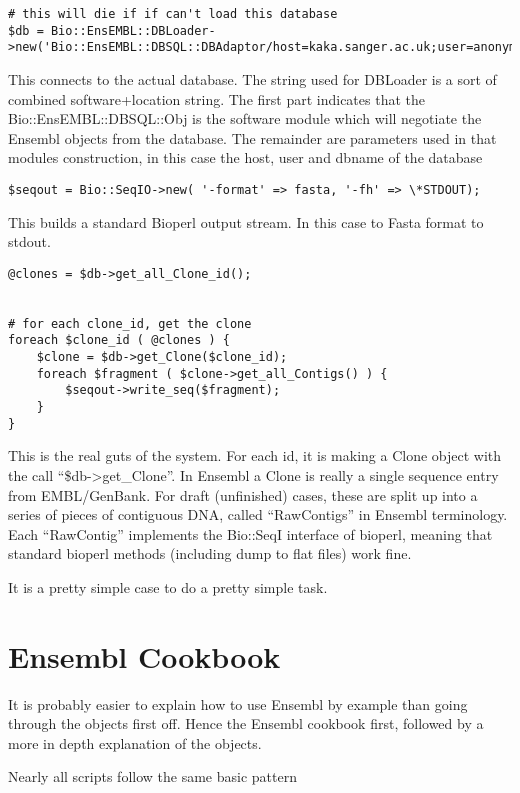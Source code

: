 \documentclass[11pt,a4paper]{article}
\begin{document}
\begin{verbatim}
# this will die if if can't load this database
$db = Bio::EnsEMBL::DBLoader->new('Bio::EnsEMBL::DBSQL::DBAdaptor/host=kaka.sanger.ac.uk;user=anonymous;dbname=current');
\end{verbatim}

This connects to the actual database. The string used for DBLoader is
a sort of combined software+location string. The first part indicates
that the Bio::EnsEMBL::DBSQL::Obj is the software module which will
negotiate the Ensembl objects from the database. The remainder are
parameters used in that modules construction, in this case the host,
user and dbname of the database

\begin{verbatim}
$seqout = Bio::SeqIO->new( '-format' => fasta, '-fh' => \*STDOUT);
\end{verbatim}

This builds a standard Bioperl output stream. In this case to Fasta format to stdout.

\begin{verbatim}
@clones = $db->get_all_Clone_id();


# for each clone_id, get the clone
foreach $clone_id ( @clones ) {
	$clone = $db->get_Clone($clone_id);
	foreach $fragment ( $clone->get_all_Contigs() ) {
		$seqout->write_seq($fragment);
   	}
}
\end{verbatim}

This is the real guts of the system. For each id, it is making a Clone
object with the call ``\$db->get\_Clone''. In Ensembl a Clone is
really a single sequence entry from EMBL/GenBank. For draft
(unfinished) cases, these are split up into a series of pieces of
contiguous DNA, called ``RawContigs'' in Ensembl terminology. Each
``RawContig'' implements the Bio::SeqI interface of bioperl, meaning
that standard bioperl methods (including dump to flat files) work
fine.


It is a pretty simple case to do a pretty simple task. 

\section{Ensembl Cookbook}


It is probably easier to explain how to use Ensembl by example than going
through the objects first off. Hence the Ensembl cookbook first, followed by 
a more in depth explanation of the objects.

Nearly all scripts follow the same basic pattern
\end{document}
